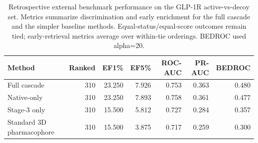 \begin{table}[htbp]
\centering
\normalsize
\caption{Retrospective external benchmark performance on the GLP-1R active-vs-decoy set. Metrics summarize discrimination and early enrichment for the full cascade and the simpler baseline methods. Equal-status/equal-score outcomes remain tied; early-retrieval metrics average over within-tie orderings. BEDROC used alpha=20.}
\label{tab:benchmark_summary_core}
\setlength{\tabcolsep}{4pt}
\begin{tabular}{lrrrrrr}
\toprule
Method & Ranked & EF1\% & EF5\% & ROC-AUC & PR-AUC & BEDROC \\
\midrule
Full cascade & 310 & 23.250 & 7.926 & 0.753 & 0.363 & 0.480 \\
Native-only & 310 & 23.250 & 7.893 & 0.758 & 0.361 & 0.477 \\
Stage-3 only & 310 & 15.500 & 5.812 & 0.727 & 0.284 & 0.357 \\
Standard 3D pharmacophore & 310 & 15.500 & 3.875 & 0.717 & 0.259 & 0.300 \\
\bottomrule
\end{tabular}
\end{table}